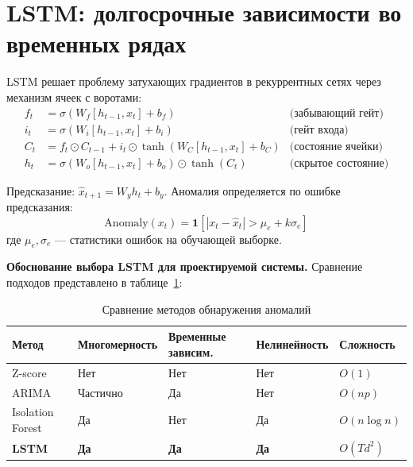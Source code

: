 \section{LSTM: долгосрочные зависимости во временных рядах}

LSTM \cite{goodfellow_deep_learning,lstm_time_series} решает проблему затухающих градиентов в рекуррентных сетях через механизм ячеек с воротами:
\begin{align}
f_t &= \sigma(W_f [h_{t-1}, x_t] + b_f) & \text{(забывающий гейт)} \label{eq:lstm_forget} \\
i_t &= \sigma(W_i [h_{t-1}, x_t] + b_i) & \text{(гейт входа)} \label{eq:lstm_input} \\
C_t &= f_t \odot C_{t-1} + i_t \odot \tanh(W_C [h_{t-1}, x_t] + b_C) & \text{(состояние ячейки)} \label{eq:lstm_cell_state} \\
h_t &= \sigma(W_o [h_{t-1}, x_t] + b_o) \odot \tanh(C_t) & \text{(скрытое состояние)} \label{eq:lstm_hidden}
\end{align}

Предсказание: $\hat{x}_{t+1} = W_y h_t + b_y$. Аномалия определяется по ошибке предсказания:
\begin{equation}
\text{Anomaly}(x_t) = \mathbf{1}[|x_t - \hat{x}_t| > \mu_e + k\sigma_e]
\label{eq:lstm_anomaly}
\end{equation}
где $\mu_e, \sigma_e$ --- статистики ошибок на обучающей выборке.

\textbf{Обоснование выбора LSTM для проектируемой системы.} Сравнение подходов представлено в таблице~\ref{tab:anomaly_methods_comparison}:

\begin{table}[H]
\centering
\caption{Сравнение методов обнаружения аномалий}
\label{tab:anomaly_methods_comparison}
\setlength{\tabcolsep}{3pt}
\begin{tabular}{|p{2.8cm}|p{2.5cm}|p{3cm}|p{2.5cm}|p{2.5cm}|}
\hline
\textbf{Метод} & \textbf{Многомер\-ность} & \textbf{Временные зависим.} & \textbf{Нелиней\-ность} & \textbf{Сложность} \\
\hline
Z-score & Нет & Нет & Нет & $O(1)$ \\
\hline
ARIMA & Частично & Да & Нет & $O(np)$ \\
\hline
Isolation Forest & Да & Нет & Да & $O(n \log n)$ \\
\hline
\textbf{LSTM} & \textbf{Да} & \textbf{Да} & \textbf{Да} & $O(Td^2)$ \\
\hline
\end{tabular}
\end{table}

